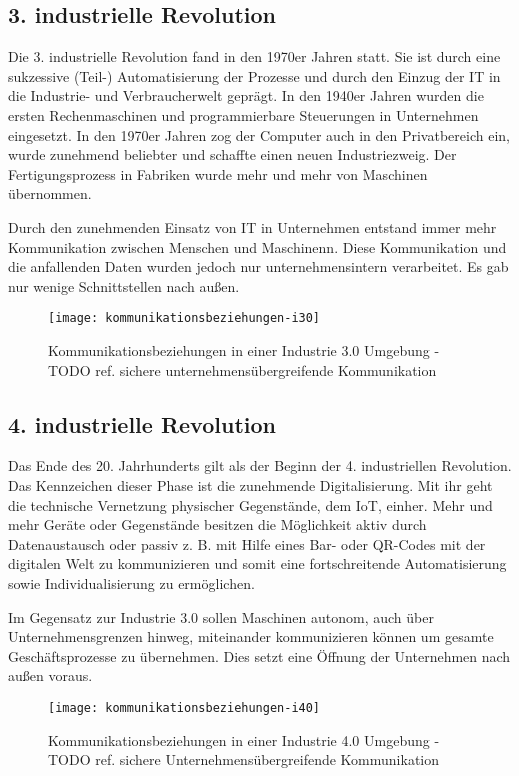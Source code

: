 \subsection{3. industrielle Revolution}
Die 3. industrielle Revolution fand in den 1970er Jahren statt. Sie ist durch eine sukzessive (Teil-) Automatisierung der Prozesse und durch den Einzug der IT in die Industrie- und Verbraucherwelt geprägt. In den 1940er Jahren wurden die ersten Rechenmaschinen und programmierbare Steuerungen in Unternehmen eingesetzt. In den 1970er Jahren zog der Computer auch in den Privatbereich ein, wurde zunehmend beliebter und schaffte einen neuen Industriezweig. Der Fertigungsprozess in Fabriken wurde mehr und mehr von Maschinen übernommen.

Durch den zunehmenden Einsatz von IT in Unternehmen entstand immer mehr Kommunikation zwischen Menschen und Maschinenn. Diese Kommunikation und die anfallenden Daten wurden jedoch nur unternehmensintern verarbeitet. Es gab nur wenige Schnittstellen nach außen.

\begin{figure}[h]
  \centering
  \texttt{[image: kommunikationsbeziehungen-i30]}
  \caption{Kommunikationsbeziehungen in einer Industrie 3.0 Umgebung - TODO ref. sichere unternehmensübergreifende Kommunikation}
  \label{Kap2:Industrie3.0-Kommunikation}
\end{figure}

\clearpage

\subsection{4. industrielle Revolution}
Das Ende des 20. Jahrhunderts gilt als der Beginn der 4. industriellen Revolution. Das Kennzeichen dieser Phase ist die zunehmende Digitalisierung. Mit ihr geht die technische Vernetzung physischer Gegenstände, dem \ac{IoT}, einher. Mehr und mehr Geräte oder Gegenstände besitzen die Möglichkeit aktiv durch Datenaustausch oder passiv z. B. mit Hilfe eines Bar- oder QR-Codes mit der digitalen Welt zu kommunizieren und somit eine fortschreitende Automatisierung sowie Individualisierung zu ermöglichen. 

Im Gegensatz zur Industrie 3.0 sollen Maschinen autonom, auch über Unternehmensgrenzen hinweg, miteinander kommunizieren können um gesamte Geschäftsprozesse zu übernehmen. Dies setzt eine Öffnung der Unternehmen nach außen voraus.

\begin{figure}[h]
  \centering
  \texttt{[image: kommunikationsbeziehungen-i40]}
  \caption{Kommunikationsbeziehungen in einer Industrie 4.0 Umgebung - TODO ref. sichere Unternehmensübergreifende Kommunikation}
  \label{Kap2:Industrie4.0-Kommunikation}
\end{figure}

